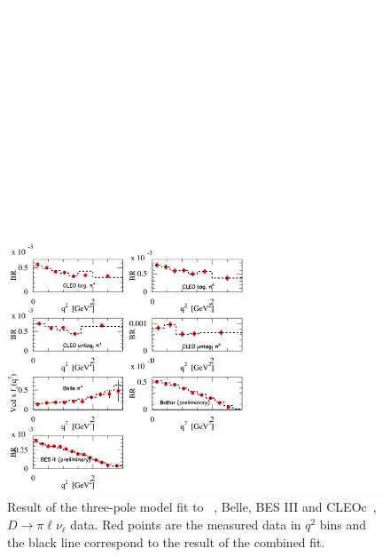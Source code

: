 \begin{figure}[p]
\begin{center}
\includegraphics[bb = 0 0 425 425, width=1\textwidth]{figures/charm/sl_plot3.pdf}
\caption{Result of the three-pole model fit \cite{Becirevic:2014kaa} to \babar~\cite{babar-new}, Belle\cite{Widhalm:2006wz}, 
BES III\cite{BESIII-new} and CLEOc~\cite{Besson:2009uv},~\cite{Dobbs:2007aa} $D \to \pi \ell \nu_\ell $ data. Red points are the 
measured data in $q^2$ bins and the black line correspond to the result of the combined fit.
\label{plot3}
}
\end{center}
\end{figure}


